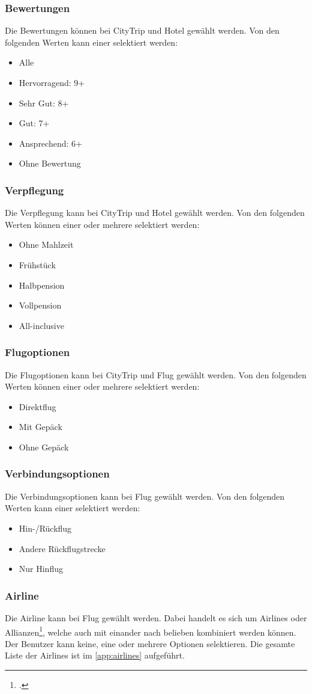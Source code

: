 \subsubsection{Bewertungen}
Die Bewertungen können bei CityTrip und Hotel gewählt werden. Von den folgenden Werten kann einer selektiert werden:
\begin{itemize}
\item Alle
\item Hervorragend: 9+
\item Sehr Gut: 8+
\item Gut: 7+
\item Ansprechend: 6+
\item Ohne Bewertung
\end{itemize}

\subsubsection{Verpflegung}
Die Verpflegung kann bei CityTrip und Hotel gewählt werden. Von den folgenden Werten können einer oder mehrere selektiert werden:
\begin{itemize}
\item Ohne Mahlzeit
\item Frühstück
\item Halbpension
\item Vollpension
\item All-inclusive
\end{itemize}

\subsubsection{Flugoptionen}
Die Flugoptionen kann bei CityTrip und Flug gewählt werden. Von den folgenden Werten können einer oder mehrere selektiert werden:
\begin{itemize}
\item Direktflug
\item Mit Gepäck
\item Ohne Gepäck
\end{itemize}

\subsubsection{Verbindungsoptionen}
Die Verbindungsoptionen kann bei Flug gewählt werden. Von den folgenden Werten kann einer selektiert werden:
\begin{itemize}
\item Hin-/Rückflug
\item Andere Rückflugstrecke
\item Nur Hinflug
\end{itemize}

\subsubsection{Airline}
Die Airline kann bei Flug gewählt werden. Dabei handelt es sich um Airlines oder Allianzen\footcite{Airline_alliance}, welche auch mit einander nach belieben kombiniert werden können. Der Benutzer kann keine, eine oder mehrere Optionen selektieren. Die gesamte Liste der Airlines ist im \cref{app:airlines}  aufgeführt.